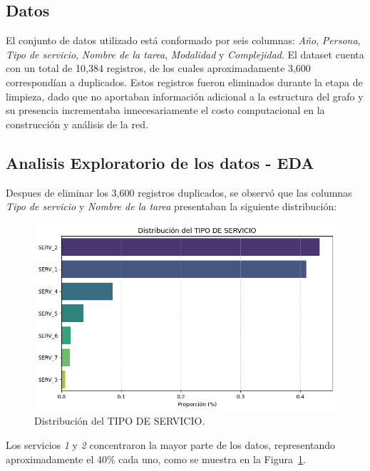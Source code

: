\documentclass[twocolumn]{article}
\begin{document}
\subsection{Datos}
El conjunto de datos utilizado está conformado por seis columnas: \textit{Año}, \textit{Persona}, \textit{Tipo de servicio}, \textit{Nombre de la tarea}, \textit{Modalidad} y \textit{Complejidad}. 
El dataset cuenta con un total de 10,384 registros, de los cuales aproximadamente 3,600 correspondían a duplicados. 
Estos registros fueron eliminados durante la etapa de limpieza, dado que no aportaban información adicional a la estructura del grafo y su presencia incrementaba innecesariamente el costo computacional en la construcción y análisis de la red. 

\subsection{Analisis Exploratorio de los datos - EDA}
Despues de eliminar los 3,600 registros duplicados, se observó que las columnas \textit{Tipo de servicio} y \textit{Nombre de la tarea} presentaban la siguiente distribución:

\begin{figure}[H]
    \centering
    \includegraphics[width=\columnwidth]{img/DistribucionTipoServicio.png}
    \caption{Distribución del TIPO DE SERVICIO.}
    \label{fig:distribucion_tipo_servicio}
\end{figure}

Los servicios \textit{1} y \textit{2} concentraron la mayor parte de los datos, representando aproximadamente el 40\% cada uno, como se muestra en la Figura~\ref{fig:distribucion_tipo_servicio}.
\end{document}

